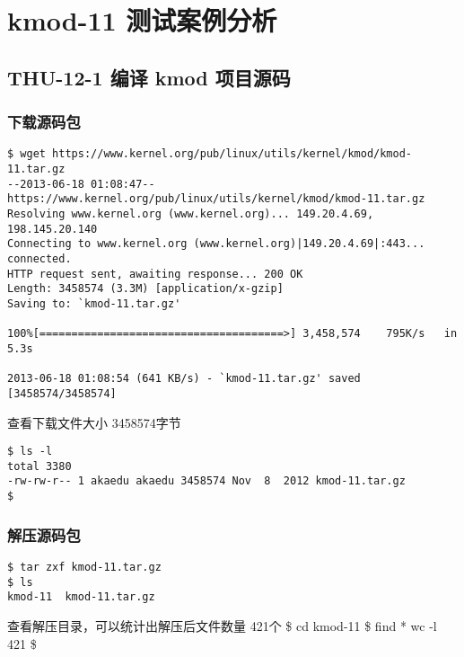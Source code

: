 \documentclass[11pt,a4paper]{article}
\begin{document}
\section{kmod-11 测试案例分析}

\subsection{THU-12-1 编译 kmod 项目源码}

\subsubsection{下载源码包}

{\begin{shaded}\begin{verbatim}
$ wget https://www.kernel.org/pub/linux/utils/kernel/kmod/kmod-11.tar.gz
--2013-06-18 01:08:47--  https://www.kernel.org/pub/linux/utils/kernel/kmod/kmod-11.tar.gz
Resolving www.kernel.org (www.kernel.org)... 149.20.4.69, 198.145.20.140
Connecting to www.kernel.org (www.kernel.org)|149.20.4.69|:443... connected.
HTTP request sent, awaiting response... 200 OK
Length: 3458574 (3.3M) [application/x-gzip]
Saving to: `kmod-11.tar.gz'

100%[======================================>] 3,458,574    795K/s   in 5.3s    

2013-06-18 01:08:54 (641 KB/s) - `kmod-11.tar.gz' saved [3458574/3458574]
\end{verbatim}\end{shaded}}
查看下载文件大小 3458574字节

{\begin{shaded}\begin{verbatim}
$ ls -l
total 3380
-rw-rw-r-- 1 akaedu akaedu 3458574 Nov  8  2012 kmod-11.tar.gz
$ 
\end{verbatim}\end{shaded}}
\subsubsection{解压源码包}

{\begin{shaded}\begin{verbatim}
$ tar zxf kmod-11.tar.gz 
$ ls
kmod-11  kmod-11.tar.gz
\end{verbatim}\end{shaded}}
查看解压目录，可以统计出解压后文件数量 421个 \$ cd kmod-11 \$ find *
\textbar{} wc -l 421 \$
\end{document}
